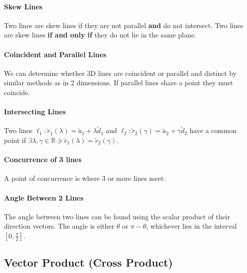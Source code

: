 \documentclass[a4paper,twoside]{article}
\begin{document}
				\paragraph{Skew Lines} Two lines are skew lines if they are not parallel \textbf{and} do not intersect. Two lines are skew lines \textbf{if and only if} they do not lie in the same plane.
				
				\paragraph{Coincident and Parallel Lines} We can determine whether 3D lines are coincident or parallel and distinct by similar methods as in 2 dimensions. If parallel lines share a point they must coincide.
				
				\paragraph{Intersecting Lines} Two lines $\ell_1:\utilde{r}_1(\lambda)=\utilde{a}_1+\lambda\utilde{d}_1$ and $\ell_2:\utilde{r}_2(\gamma)=\utilde{a}_2+\gamma\utilde{d}_2$ have a common point if $\exists\lambda,\gamma\in\mathbb{R}\ni\utilde{r}_1(\lambda)=\utilde{r}_2(\gamma)$.
				
				\paragraph{Concurrence of 3 lines} A point of concurrence is where 3 or more lines meet.
				
				\paragraph{Angle Between 2 Lines} The angle between two lines can be found using the scalar product of their direction vectors. The angle is either $\theta$ or $\pi-\theta$, whichever lies in the interval $[0,\frac{\pi}{2}]$.
		\subsection{Vector Product (Cross Product)}
\end{document}
